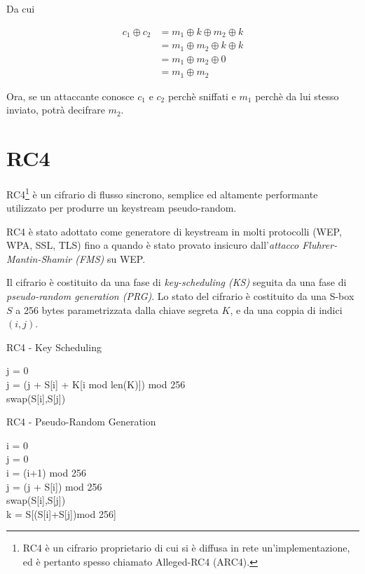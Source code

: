 Da cui

\begin{equation}
\begin{split}
c_{1} \oplus c_{2} & = m_{1} \oplus k \oplus m_{2} \oplus k \\
& = m_{1} \oplus m_{2} \oplus k \oplus k \\
& = m_{1} \oplus m_{2} \oplus 0 \\
& = m_{1} \oplus m_{2}
\end{split}
\end{equation}

Ora, se un attaccante conosce $c_{1}$ e $c_{2}$ perchè sniffati e $m_{1}$ perchè da lui stesso inviato, potrà decifrare $m_{2}$.

\section{RC4}
RC4\footnote{RC4 è un cifrario proprietario di cui si è diffusa in rete un'implementazione, ed è pertanto spesso chiamato Alleged-RC4 (ARC4).} è un cifrario di flusso sincrono, semplice ed altamente performante utilizzato per produrre un keystream pseudo-random.

RC4 è stato adottato come generatore di keystream in molti protocolli (WEP, WPA, SSL, TLS) fino a quando è stato provato insicuro dall'\textit{attacco Fluhrer-Mantin-Shamir (FMS)} su WEP.

Il cifrario è costituito da una fase di \textit{key-scheduling (KS)} seguita da una fase di \textit{pseudo-random generation (PRG)}.
Lo stato del cifrario è costituito da una S-box $S$ a 256 bytes parametrizzata dalla chiave segreta $K$, e da una coppia di indici $(i,j)$.

\bigskip
\begin{algorithm}[H]
  \caption{RC4 - Key Scheduling}
  \label{alg:rc4-key-scheduling}
  \SetAlgoNoLine
  j = 0\\
   {
    j = (j + S[i] + K[i mod len(K)]) mod 256\\
    swap(S[i],S[j])\\
  }
\end{algorithm}

\bigskip
\begin{algorithm}[H]
  \caption{RC4 - Pseudo-Random Generation}
  \label{alg:rc4-pseudorandom-generation}
  \SetAlgoNoLine
  i = 0\\
  j = 0\\
   {
    i = (i+1) mod 256\\
    j = (j + S[i]) mod 256\\
    swap(S[i],S[j])\\
    k = S[(S[i]+S[j])mod 256]\\
  }
\end{algorithm}


